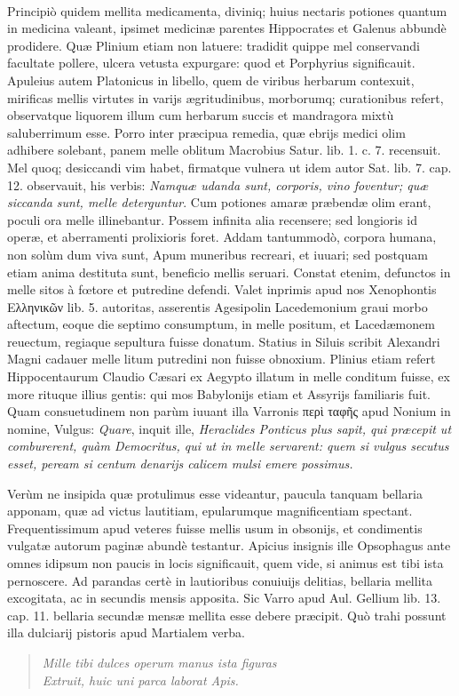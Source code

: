 \documentclass[a4paper, 11pt, oneside, polutonikogreek, latin]{article}
\begin{document}
\paragraph{}
Principiò quidem mellita medicamenta, diviniq; huius nectaris potiones quantum in medicina valeant, ipsimet medicinæ parentes Hippocrates et Galenus abbundè prodidere. Quæ Plinium etiam non latuere: tradidit quippe mel conservandi facultate pollere, ulcera vetusta expurgare: quod et Porphyrius significauit. Apuleius autem Platonicus in libello, quem de viribus herbarum contexuit, mirificas mellis virtutes in varijs ægritudinibus, morborumq; curationibus refert, observatque liquorem illum cum herbarum succis et mandragora mixtù saluberrimum esse. Porro inter præcipua remedia, quæ ebrijs medici olim adhibere solebant, panem melle oblitum Macrobius Satur. lib. 1. c. 7. recensuit. Mel quoq; desiccandi vim habet, firmatque vulnera ut idem autor Sat. lib. 7. cap. 12. observauit, his verbis: \emph{Namquæ udanda sunt, corporis, vino foventur; quæ siccanda sunt, melle deterguntur}. Cum potiones amaræ præbendæ olim erant, poculi ora melle illinebantur. Possem infinita alia recensere; sed longioris id operæ, et aberramenti prolixioris foret. Addam tantummodò, corpora humana, non solùm dum viva sunt, Apum muneribus recreari, et iuuari; sed postquam etiam anima destituta sunt, beneficio mellis seruari. Constat etenim, defunctos in melle sitos à fœtore et putredine defendi. Valet inprimis apud nos Xenophontis Ελληνικῶν lib. 5. autoritas, asserentis Agesipolin Lacedemonium graui morbo aftectum, eoque die septimo consumptum, in melle positum, et Lacedæmonem reuectum, regiaque sepultura fuisse donatum. Statius in Siluis scribit Alexandri Magni cadauer melle litum putredini non fuisse obnoxium. Plinius etiam refert Hippocentaurum Claudio Cæsari ex Aegypto illatum in melle conditum fuisse, ex more rituque illius gentis: qui mos Babylonijs etiam et Assyrijs familiaris fuit. Quam consuetudinem non parùm iuuant illa Varronis περὶ ταφῆς apud Nonium in nomine, Vulgus: \emph{Quare}, inquit ille, \emph{Heraclides Ponticus plus sapit, qui præcepit ut comburerent, quàm Democritus, qui ut in melle servarent: quem si vulgus secutus esset, peream si centum denarijs calicem mulsi emere possimus.}

Verùm ne insipida quæ protulimus esse videantur, paucula tanquam bellaria apponam, quæ ad victus lautitiam, epularumque magnificentiam spectant. Frequentissimum apud veteres fuisse mellis usum in obsonijs, et condimentis vulgatæ autorum paginæ abundè testantur. Apicius insignis ille Opsophagus ante omnes idipsum non paucis in locis significauit, quem vide, si animus est tibi ista pernoscere. Ad parandas certè in lautioribus conuiuijs delitias, bellaria mellita excogitata, ac in secundis mensis apposita. Sic Varro apud Aul. Gellium lib. 13. cap. 11. bellaria secundæ mensæ mellita esse debere præcipit. Quò trahi possunt illa dulciarij pistoris apud Martialem verba.
\begin{quote}
\emph{Mille tibi dulces operum manus ista figuras}\\
\hspace*{10mm}\emph{Extruit, huic uni parca laborat Apis.}\\
\end{quote}
\vspace*{-8mm}
\end{document}
